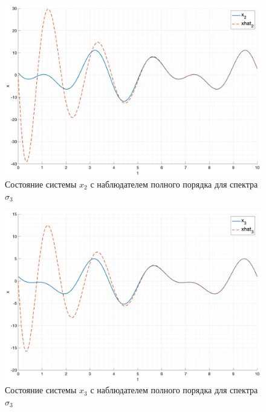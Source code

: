 \begin{figure}[ht!]
    \centering
    \includegraphics[width=\textwidth]{media/plots/task2_x2_3.png}
    \caption{Состояние системы $x_2$ с наблюдателем полного порядка для спектра $\sigma_3$}
    \label{fig:task2_x2_3}
\end{figure}

\begin{figure}[ht!]
    \centering
    \includegraphics[width=\textwidth]{media/plots/task2_x3_3.png}
    \caption{Состояние системы $x_3$ с наблюдателем полного порядка для спектра $\sigma_3$}
    \label{fig:task2_x3_3}
\end{figure}

